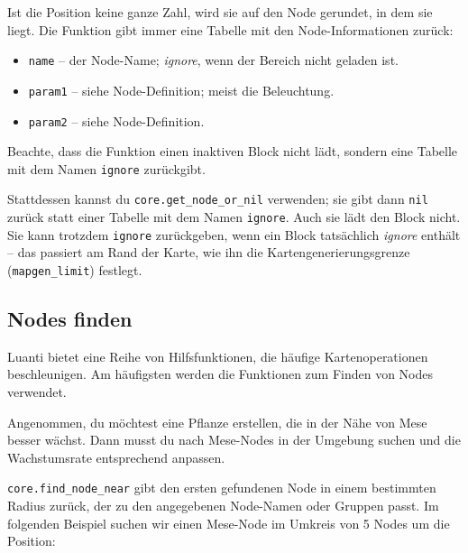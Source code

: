 Ist die Position keine ganze Zahl, wird sie auf den Node gerundet, in
dem sie liegt. Die Funktion gibt immer eine Tabelle mit den
Node-Informationen zurück:

\begin{itemize}
\tightlist
\item
  \texttt{name} -- der Node-Name; \emph{ignore}, wenn der Bereich nicht
  geladen ist.
\item
  \texttt{param1} -- siehe Node-Definition; meist die Beleuchtung.
\item
  \texttt{param2} -- siehe Node-Definition.
\end{itemize}

Beachte, dass die Funktion einen inaktiven Block nicht lädt, sondern
eine Tabelle mit dem Namen \texttt{ignore} zurückgibt.

Stattdessen kannst du
\texttt{core.\allowbreak{}get\_\allowbreak{}node\_\allowbreak{}or\_\allowbreak{}nil}
verwenden; sie gibt dann \texttt{nil} zurück statt einer Tabelle mit dem
Namen \texttt{ignore}. Auch sie lädt den Block nicht. Sie kann trotzdem
\texttt{ignore} zurückgeben, wenn ein Block tatsächlich \emph{ignore}
enthält -- das passiert am Rand der Karte, wie ihn die
Kartengenerierungsgrenze (\texttt{mapgen\_\allowbreak{}limit}) festlegt.

\subsection{Nodes finden}\label{nodes-finden}

Luanti bietet eine Reihe von Hilfsfunktionen, die häufige
Kartenoperationen beschleunigen. Am häufigsten werden die Funktionen zum
Finden von Nodes verwendet.

Angenommen, du möchtest eine Pflanze erstellen, die in der Nähe von Mese
besser wächst. Dann musst du nach Mese-Nodes in der Umgebung suchen und
die Wachstumsrate entsprechend anpassen.

\texttt{core.\allowbreak{}find\_\allowbreak{}node\_\allowbreak{}near}
gibt den ersten gefundenen Node in einem bestimmten Radius zurück, der
zu den angegebenen Node-Namen oder Gruppen passt.
Im folgenden Beispiel suchen wir einen Mese-Node im Umkreis von 5 Nodes
um die Position:

